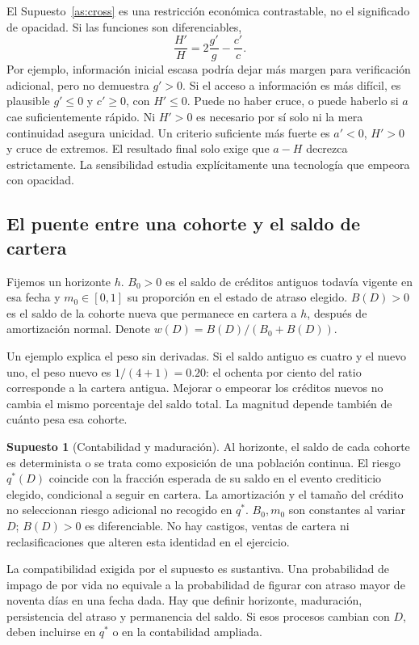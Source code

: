 \documentclass[11pt]{article}
\theoremstyle{definition}\newtheorem{assumption}{Supuesto}
\begin{document}
El Supuesto~\ref{as:cross} es una restricción económica contrastable, no el
significado de opacidad. Si las funciones son diferenciables,
\begin{equation}\label{eq:logs}
\frac{H'}H=2\frac{g'}g-\frac{c'}c.
\end{equation}
Por ejemplo, información inicial escasa podría dejar más margen para
verificación adicional, pero no demuestra $g'>0$. Si el acceso a información
es más difícil, es plausible $g'\le0$ y $c'\ge0$, con $H'\le0$. Puede no
haber cruce, o puede haberlo si $a$ cae suficientemente rápido. Ni $H'>0$ es
necesario por sí solo ni la mera continuidad asegura unicidad. Un criterio
suficiente más fuerte es $a'<0$, $H'>0$ y cruce de extremos.
El resultado final solo exige que $a-H$ decrezca estrictamente. La sensibilidad
estudia explícitamente una tecnología que empeora con opacidad.

\subsection{El puente entre una cohorte y el saldo de cartera}
Fijemos un horizonte $h$. $B_0>0$ es el saldo de créditos antiguos todavía
vigente en esa fecha y $m_0\in[0,1]$ su proporción en el estado de atraso
elegido. $B(D)>0$ es el saldo de la cohorte nueva que permanece en cartera a
$h$, después de amortización normal. Denote $w(D)=B(D)/(B_0+B(D))$.

Un ejemplo explica el peso sin derivadas. Si el saldo antiguo es cuatro y
el nuevo uno, el peso nuevo es $1/(4+1)=0.20$: el ochenta por ciento del
ratio corresponde a la cartera antigua. Mejorar o empeorar los créditos
nuevos no cambia el mismo porcentaje del saldo total. La magnitud depende
también de cuánto pesa esa cohorte.

\begin{assumption}[Contabilidad y maduración]\label{as:stock}
Al horizonte, el saldo de cada cohorte es determinista o se trata como
exposición de una población continua. El riesgo $q^*(D)$ coincide con la
fracción esperada de su saldo en el evento crediticio elegido, condicional
a seguir en cartera. La amortización y el tamaño del crédito no seleccionan
riesgo adicional no recogido en $q^*$. $B_0,m_0$ son constantes al variar $D$;
$B(D)>0$ es diferenciable. No hay castigos, ventas de cartera ni
reclasificaciones que alteren esta identidad en el ejercicio.
\end{assumption}
La compatibilidad exigida por el supuesto es sustantiva. Una
probabilidad de impago de por vida no equivale a la probabilidad de figurar
con atraso mayor de noventa días en una fecha dada. Hay que definir horizonte,
maduración, persistencia del atraso y permanencia del saldo. Si esos procesos
cambian con $D$, deben incluirse en $q^*$ o en la contabilidad ampliada.
\end{document}
